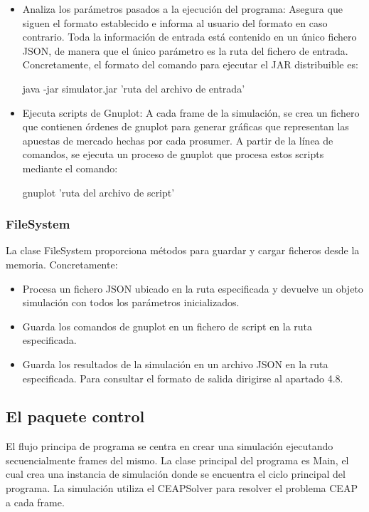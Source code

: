 \documentclass[12pt,a4paper,openright,oneside]{article}
\numberwithin{equation}{section}
\theoremstyle{definition}
\begin{document}
\begin{itemize}
\item Analiza los parámetros pasados a la ejecución del programa: Asegura que siguen el formato establecido e informa al usuario del formato en caso contrario. Toda la información de entrada está contenido en un único fichero JSON, de manera que el único parámetro es la ruta del fichero de entrada. Concretamente, el formato del comando para ejecutar el JAR distribuible es:

java -jar simulator.jar 'ruta del archivo de entrada'

\item Ejecuta scripts de Gnuplot: A cada frame de la simulación, se crea un fichero que contienen órdenes de gnuplot para generar gráficas que representan las apuestas de mercado hechas por cada prosumer. A partir de la línea de comandos, se ejecuta un proceso de gnuplot que procesa estos scripts mediante el comando:

gnuplot 'ruta del archivo de script'

\end{itemize}

\subsubsection{FileSystem}
La clase FileSystem proporciona métodos para guardar y cargar ficheros desde la memoria. Concretamente:

\begin{itemize}
\item Procesa un fichero JSON ubicado en la ruta especificada y devuelve un objeto simulación con todos los parámetros inicializados.
\item Guarda los comandos de gnuplot en un fichero de script en la ruta especificada. 
\item Guarda los resultados de la simulación en un archivo JSON en la ruta especificada. Para consultar el formato de salida dirigirse al apartado 4.8.
\end{itemize}

\subsection{El paquete control}
El flujo principa de programa se centra en crear una simulación ejecutando secuencialmente frames del mismo. La clase principal del programa es Main, el cual crea una instancia de simulación donde se encuentra el ciclo principal del programa. La simulación utiliza el CEAPSolver para resolver el problema CEAP a cada frame.
\end{document}
